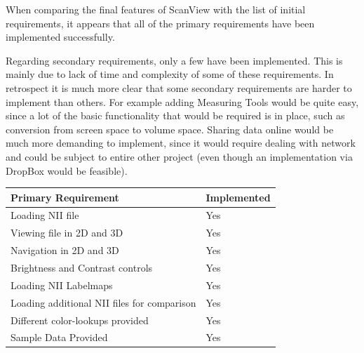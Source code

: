 \documentclass[a4paper,11pt,twoside]{article}
\begin{document}
When comparing the final features of ScanView with the list of initial requirements, it appears that all of the primary requirements have been implemented successfully.


Regarding secondary requirements, only a few have been implemented. This is mainly due to lack of time and complexity of some of these requirements. In retrospect it is much more clear that some secondary requirements are harder to implement than others. For example adding Measuring Tools would be quite easy, since a lot of the basic functionality that would be required is in place, such as conversion from screen space to volume space. Sharing data online would be much more demanding to implement, since it would require dealing with network and could be subject to entire other project (even though an implementation via DropBox would be feasible).



\begin{center}

  \begin{tabular}{| l | l |}
    \hline
    Primary Requirement & Implemented \\ \hline \hline
	Loading NII file & Yes\\ \hline
	Viewing file in 2D and 3D & Yes\\ \hline
	Navigation in 2D and 3D & Yes\\ \hline
	Brightness and Contrast controls & Yes \\ \hline
	Loading NII Labelmaps & Yes \\ \hline
	Loading additional NII files for comparison & Yes \\ \hline
	Different color-lookups provided & Yes \\ \hline
	Sample Data Provided & Yes \\ \hline

  \end{tabular}\\
\end{center}
\end{document}
